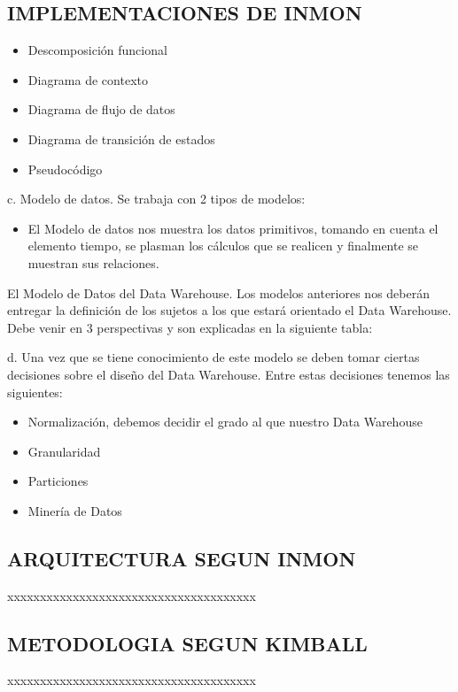 \documentclass[%
 reprint,
 amsmath,amssymb,
 aps,
]{revtex4-1}
\begin{document}

\subsection{IMPLEMENTACIONES DE  INMON}
\begin{itemize}
	\item Descomposición funcional
	\item Diagrama de contexto
	\item Diagrama de flujo de datos
	\item Diagrama de transición de estados
	\item Pseudocódigo
\end{itemize}

	c. Modelo de datos. Se trabaja con 2 tipos de modelos:
		\begin{itemize}
			\item El Modelo de datos nos muestra los datos primitivos, tomando en cuenta el elemento tiempo, se plasman los cálculos que se realicen y finalmente se muestran sus relaciones.
		\end{itemize}

El Modelo de Datos del Data Warehouse. Los modelos anteriores nos deberán entregar la definición de los sujetos a los que estará orientado el Data Warehouse. Debe venir en 3 perspectivas y son explicadas en la siguiente tabla:


	d. Una vez que se tiene conocimiento de este modelo se deben tomar ciertas decisiones sobre el diseño del Data Warehouse. Entre estas decisiones tenemos las siguientes:
		\begin{itemize}
			\item Normalización, debemos decidir el grado al que nuestro Data Warehouse
			\item Granularidad
			\item Particiones
			\item  Minería de Datos
		\end{itemize}

\subsection{ARQUITECTURA SEGUN INMON}
xxxxxxxxxxxxxxxxxxxxxxxxxxxxxxxxxxxxxx 

\subsection{METODOLOGIA SEGUN KIMBALL}	
xxxxxxxxxxxxxxxxxxxxxxxxxxxxxxxxxxxxxx 
\end{document}
